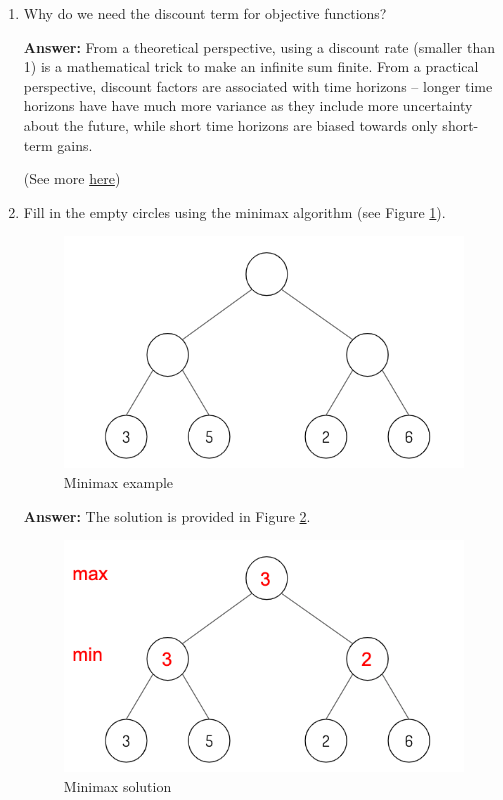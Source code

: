 \documentclass{article}
\newenvironment{QandA}{\begin{enumerate}[label=\arabic*.]}{\end{enumerate}}
\newenvironment{answer}{\par\normalfont \textbf{Answer:}}{}
\begin{document}
\begin{QandA}
\begin{answer}
        (Source: \href{https://www.quora.com/What-is-a-finite-horizon-in-the-context-of-reinforcement-learning}{Quora})
    \end{answer}

    \item Why do we need the discount term for objective functions?
    \begin{answer}
        From a theoretical perspective, using a discount rate (smaller than 1) is a mathematical trick to make an infinite sum finite. From a practical perspective, discount factors are associated with time horizons -- longer time horizons have have much more variance as they include more uncertainty about the future, while short time horizons are biased towards only short-term gains.

        (See more \href{https://stats.stackexchange.com/questions/221402/understanding-the-role-of-the-discount-factor-in-reinforcement-learning}{here})
    \end{answer}

    \item Fill in the empty circles using the minimax algorithm (see Figure \ref{fig:minimax}).
    
    \begin{figure}[h!]
        \centering
        \includegraphics[width=0.5\columnwidth]{img/minimax.png}
        \caption{Minimax example}
        \label{fig:minimax}
    \end{figure}
    \begin{answer}
        The solution is provided in Figure \ref{fig:minimax-sol}.
    \end{answer}
    \begin{figure}[h!]
        \centering
        \includegraphics[width=0.5\columnwidth]{img/minimax-sol.png}
        \caption{Minimax solution}
        \label{fig:minimax-sol}
    \end{figure}


\end{QandA}
\end{document}
